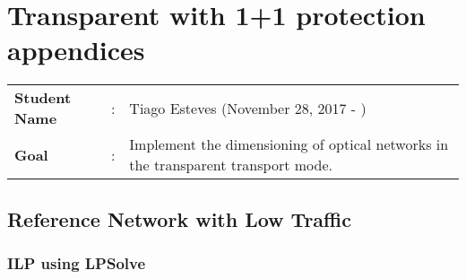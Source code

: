 \clearpage

\section{Transparent with 1+1 protection appendices}
\begin{tcolorbox}	
\begin{tabular}{p{2.75cm} p{0.2cm} p{10.5cm}} 	
\textbf{Student Name}  &:& Tiago Esteves    (November 28, 2017 - )\\
\textbf{Goal}          &:& Implement the dimensioning of optical networks in the transparent transport mode.
\end{tabular}
\end{tcolorbox}

\subsection{Reference Network with Low Traffic}

\subsubsection{ILP using LPSolve}

